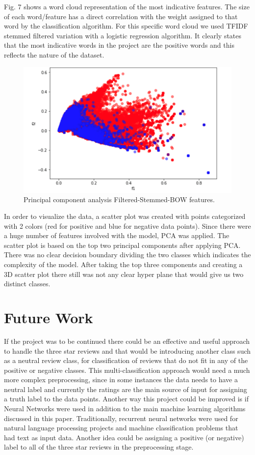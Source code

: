 \documentclass[conference]{IEEEtran}
\begin{document}
Fig. 7 shows a word cloud representation of the most indicative features. The size of each word/feature has a direct correlation with the weight assigned to that word by the classification algorithm. For this specific word cloud we used TFIDF stemmed filtered variation with a logistic regression algorithm. It clearly states that the most indicative words in the project are the positive words and this reflects the nature of the dataset.

\begin{figure}[htbp]
\centerline{\includegraphics[width=0.9\columnwidth]{pca.png}}
\caption{Principal component analysis Filtered-Stemmed-BOW features.}
\label{fig}
\end{figure}
\FloatBarrier
In order to visualize the data, a scatter plot was created with points categorized with 2 colors (red for positive and blue for negative data points). Since there were a huge number of features involved with the model, PCA was applied. The scatter plot is based on the top two principal components after applying PCA. There was no clear decision boundary dividing the two classes which indicates the complexity of the model. After taking the top three components and creating a 3D scatter plot there still was not any clear hyper plane that would give us two distinct classes.

\section{Future Work}
If the project was to be continued there could be an effective and useful approach to handle the three star reviews and that would be introducing another class such as a neutral review class, for classification of reviews that do not fit in any of the positive or negative classes. This multi-classification approach would need a much more complex preprocessing, since in some instances the data needs to have a neutral label and currently the ratings are the main source of input for assigning a truth label to the data points. Another way this project could be improved is if Neural Networks were used in addition to the main machine learning algorithms discussed in this paper. Traditionally, recurrent neural networks were used for natural language processing projects and machine classification problems that had text as input data. Another idea could be assigning a positive (or negative) label to all of the three star reviews in the preprocessing stage. 
\end{document}
